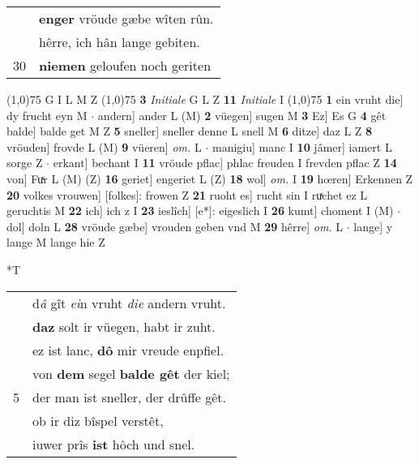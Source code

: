 \documentclass[8pt,a4paper,notitlepage]{article}
\begin{document}
\begin{table}[ht]
\begin{minipage}[t]{0.5\linewidth}
\begin{tabular}{rl}
 & \textbf{enger} vröude gæbe wîten rûn.\\ 
 & hêrre, ich hân lange gebiten.\\ 
30 & \textbf{niemen} geloufen noch geriten\\ 
\end{tabular}
\scriptsize
\line(1,0){75} \newline
G I L M Z \newline
\line(1,0){75} \newline
\textbf{3} \textit{Initiale} G L Z  \textbf{11} \textit{Initiale} I  \newline
\line(1,0){75} \newline
\textbf{1} ein vruht die] dy frucht eyn M  $\cdot$ andern] ander L (M) \textbf{2} vüegen] sugen M \textbf{3} Ez] Es G \textbf{4} gêt balde] balde get M Z \textbf{5} sneller] sneller denne L snell M \textbf{6} ditze] daz L Z \textbf{8} vröuden] frovde L (M) \textbf{9} vüeren] \textit{om.} L  $\cdot$ manigiu] manc I \textbf{10} jâmer] iamert L sorge Z  $\cdot$ erkant] bechant I \textbf{11} vröude pflac] phlac freuden I frevden pflac Z \textbf{14} von] Fuͯr L (M) (Z) \textbf{16} geriet] engeriet L (Z) \textbf{18} wol] \textit{om.} I \textbf{19} hœren] Erkennen Z \textbf{20} volkes vrouwen] [folkes]: frowen Z \textbf{21} ruoht es] rucht sin I ruͯchet ez L geruchtis M \textbf{22} ich] ich z I \textbf{23} ieslîch] [e*]: eigeslich I \textbf{26} kumt] choment I (M)  $\cdot$ dol] doln L \textbf{28} vröude gæbe] vrouden geben vnd M \textbf{29} hêrre] \textit{om.} L  $\cdot$ lange] y lange M lange hie Z \newline
\end{minipage}
\hspace{0.5cm}
\begin{minipage}[t]{0.5\linewidth}
\small
\begin{center}*T
\end{center}
\begin{tabular}{rl}
 & d\textit{â} gît \textit{ei}n vruht \textit{die} andern vruht.\\ 
 & \textbf{daz} solt ir vüegen, habt ir zuht.\\ 
 & ez ist lanc, \textbf{dô} mir vreude enpfiel.\\ 
 & von \textbf{dem} segel \textbf{balde gêt} der kiel;\\ 
5 & der man ist sneller, der drûffe gêt.\\ 
 & ob ir diz bîspel verstêt,\\ 
 & iuwer prîs \textbf{ist} hôch und snel.\\ 

\end{tabular}
\end{minipage}
\end{table}
\end{document}
